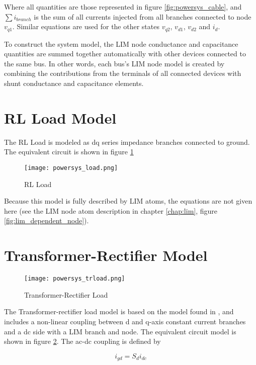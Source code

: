 Where all quantities are those represented in figure \ref{fig:powersys_cable}, and $\sum{i_{branch}}$ is the sum of all currents injected from all branches connected to node $v_{q1}$. Similar equations are used for the other states $v_{q2}$, $v_{d1}$, $v_{d2}$ and $i_d$.

To construct the system model, the LIM node conductance and capacitance quantities are summed together automatically with other devices connected to the same bus. In other words, each bus's LIM node model is created by combining the contributions from the terminals of all connected devices with shunt conductance and capacitance elements. 

\section{RL Load Model}

The RL Load is modeled as dq series impedance branches connected to ground. The equivalent circuit is shown in figure \ref{fig:powersys_load} 

\begin{figure}[h]
    \label{fig:powersys_load}
    \centering
    \texttt{[image: powersys\_load.png]}
    \caption{RL Load}
\end{figure}  

Because this model is fully described by LIM atoms, the equations are not given here (see the LIM node atom description in chapter \ref{chap:lim}, figure \ref{fig:lim_dependent_node}).

\section{Transformer-Rectifier Model}

\begin{figure}[h]
    \label{fig:powersys_trload}
    \centering
    \texttt{[image: powersys\_trload.png]}
    \caption{Transformer-Rectifier Load}
\end{figure} 

The Transformer-rectifier load model is based on the model found in \cite{abdelwahed2013}, and includes a non-linear coupling between d and q-axis constant current branches and a dc side with a LIM branch and node. The equivalent circuit model is shown in figure \ref{fig:powersys_trload}. The ac-dc coupling is defined by

\begin{equation} \label{eq:trload_igd}
    i_{gd}=S_{d}i_{dc}   
\end{equation}

